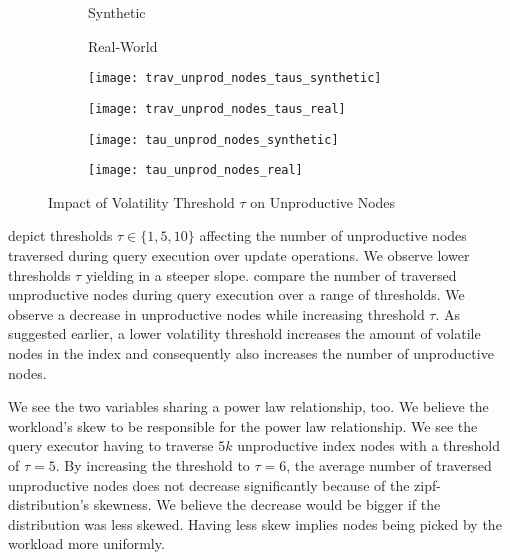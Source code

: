 \documentclass[abstracton,12pt]{scrartcl}
\theoremstyle{definition}
\begin{document}
\begin{figure}[H]
  \centering
  \begin{subfigure}{0.49\linewidth}
    \centering
    Synthetic
  \end{subfigure}
  \begin{subfigure}{0.49\linewidth}
    \centering
    Real-World
  \end{subfigure}
  \begin{subfigure}{0.49\linewidth}
    \centering
    \texttt{[image: trav\_unprod\_nodes\_taus\_synthetic]}
    \caption{}
    \label{fig:trav_unprod_nodes_taus_synthetic}
  \end{subfigure}
  \begin{subfigure}{0.49\linewidth}
    \centering
    \texttt{[image: trav\_unprod\_nodes\_taus\_real]}
    \caption{}
    \label{fig:trav_unprod_nodes_taus_real}
  \end{subfigure}
  \begin{subfigure}{0.49\linewidth}
    \centering
    \texttt{[image: tau\_unprod\_nodes\_synthetic]}
    \caption{}
    \label{fig:tau_trav_unprod_nodes_synthetic}
  \end{subfigure}
  \begin{subfigure}{0.49\linewidth}
    \centering
    \texttt{[image: tau\_unprod\_nodes\_real]}
    \caption{}
    \label{fig:tau_trav_unprod_nodes_real}
  \end{subfigure}
  \caption{Impact of Volatility Threshold $\tau$ on Unproductive Nodes}
\end{figure}


depict thresholds $\tau \in \{1,5,10\}$ affecting the number of unproductive
nodes traversed during query execution over update operations. We observe lower
thresholds $\tau$ yielding in a steeper slope.
 compare the
number of traversed unproductive nodes during query execution over a range of
thresholds. We observe a decrease in unproductive nodes while increasing
threshold $\tau$. As suggested earlier, a lower volatility threshold
increases the amount of volatile nodes in the index and consequently also
increases the number of unproductive nodes. 

We see the two variables sharing a power law relationship, too. We believe the
workload's skew to be responsible for the power law relationship. We see
the query executor having to traverse $5k$ unproductive index nodes with a
threshold of $\tau = 5$. By increasing the threshold to $\tau = 6$, the average
number of traversed unproductive nodes does not decrease significantly because
of the zipf-distribution's skewness. We believe the decrease would be bigger if the
distribution was less skewed. Having less skew implies nodes being picked
by the workload more uniformly.
\end{document}
